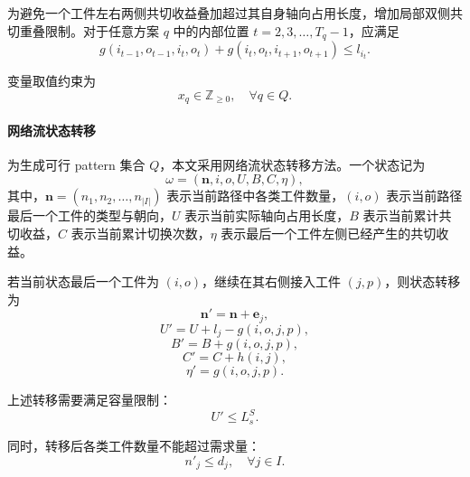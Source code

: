 \documentclass[UTF8]{ctexart}
\begin{document}
为避免一个工件左右两侧共切收益叠加超过其自身轴向占用长度，增加局部双侧共切重叠限制。对于任意方案 $q$ 中的内部位置 $t=2,3,\ldots,T_q-1$，应满足
\begin{equation}
g(i_{t-1},o_{t-1},i_t,o_t)+g(i_t,o_t,i_{t+1},o_{t+1})\leq l_{i_t}.
\label{eq:p3_overlap}
\end{equation}

变量取值约束为
\begin{equation}
x_q\in \mathbb{Z}_{\geq 0},
\quad \forall q\in Q.
\label{eq:p3_domain}
\end{equation}

\paragraph{网络流状态转移}

为生成可行 pattern 集合 $Q$，本文采用网络流状态转移方法。一个状态记为
\begin{equation}
\omega=\left(\boldsymbol{n},i,o,U,B,C,\eta\right),
\label{eq:p3_state}
\end{equation}
其中，$\boldsymbol{n}=(n_1,n_2,\ldots,n_{|I|})$ 表示当前路径中各类工件数量，$(i,o)$ 表示当前路径最后一个工件的类型与朝向，$U$ 表示当前实际轴向占用长度，$B$ 表示当前累计共切收益，$C$ 表示当前累计切换次数，$\eta$ 表示最后一个工件左侧已经产生的共切收益。

若当前状态最后一个工件为 $(i,o)$，继续在其右侧接入工件 $(j,p)$，则状态转移为
\begin{equation}
\boldsymbol{n}'=\boldsymbol{n}+\boldsymbol{e}_j,
\label{eq:p3_nprime}
\end{equation}
\begin{equation}
U'=U+l_j-g(i,o,j,p),
\label{eq:p3_Uprime}
\end{equation}
\begin{equation}
B'=B+g(i,o,j,p),
\label{eq:p3_Bprime}
\end{equation}
\begin{equation}
C'=C+h(i,j),
\label{eq:p3_Cprime}
\end{equation}
\begin{equation}
\eta'=g(i,o,j,p).
\label{eq:p3_eta}
\end{equation}

上述转移需要满足容量限制：
\begin{equation}
U'\leq L_s^S.
\label{eq:p3_Uprime_capacity}
\end{equation}

同时，转移后各类工件数量不能超过需求量：
\begin{equation}
n'_j\leq d_j,
\quad \forall j\in I.
\label{eq:p3_nprime_d}
\end{equation}
\end{document}
